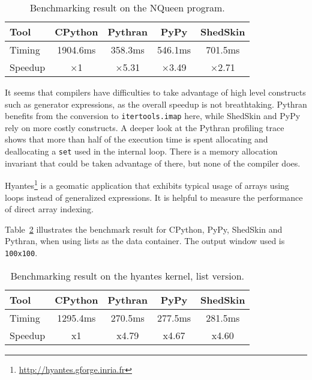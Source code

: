 \documentclass[10pt, onecolumn, preprint]{sigplanconf}
\begin{document}
\begin{table}
    \centering

    \begin{tabular}{|l|c|c|c|c|}
        \hline
     Tool    &  CPython    &   Pythran     &     PyPy   &  ShedSkin \\
    \hline
     Timing  &  1904.6ms   &   358.3ms     &    546.1ms &  701.5ms  \\
    \hline
     Speedup &  $\times$1         &    $\times$5.31      &    $\times$3.49   &  $\times$2.71    \\
    \hline
\end{tabular}
\caption{Benchmarking result on the NQueen program.}
\label{tbl:nqueen}

\end{table}

It seems that compilers have difficulties to take advantage of high level
constructs such as generator expressions, as the overall speedup is not
breathtaking. Pythran benefits from the conversion to \texttt{itertools.imap} here,
while ShedSkin and PyPy rely on more costly constructs. A deeper look at the
Pythran profiling trace shows that more than half of the execution time is
spent allocating and deallocating a \texttt{set} used in the internal loop. There is a
memory allocation invariant that could be taken advantage of there, but none of
the compiler does.

Hyantes\footnote{\url{http://hyantes.gforge.inria.fr}} is a geomatic application that exhibits typical usage of arrays
using loops instead of generalized expressions. It is helpful to measure the
performance of direct array indexing.

Table~\ref{tbl:hyantes} illustrates the benchmark result for CPython, PyPy,
ShedSkin and Pythran, when using lists as the data container. The output window
used is \texttt{100x100}.

\begin{table}
    \centering

    \begin{tabular}{|l|c|c|c|c|}

        \hline
     Tool    &  CPython    &   Pythran     &     PyPy   &  ShedSkin  \\
    \hline
     Timing  &  1295.4ms   &   270.5ms     &    277.5ms &  281.5ms   \\
    \hline
     Speedup &  x1         &    x4.79      &    x4.67   &  x4.60     \\
    \hline
\end{tabular}
\caption{Benchmarking result on the hyantes kernel, list version.}
\label{tbl:hyantes}

\end{table}
\end{document}
